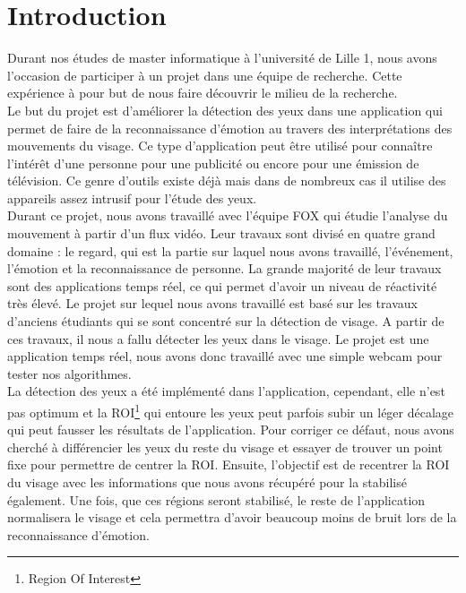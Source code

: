 \section*{Introduction}

Durant nos études de master informatique à l'université de Lille 1, nous avons l'occasion de participer à un projet
dans une équipe de recherche. Cette expérience à pour but de nous faire découvrir le milieu de la recherche.\\

Le but du projet est d'améliorer la détection des yeux dans une application qui permet de faire de la reconnaissance
d'émotion au travers des interprétations des mouvements du visage. Ce type d'application peut être utilisé pour 
connaître l'intérêt d'une personne pour une publicité ou encore pour une émission de télévision. Ce genre d'outils
existe déjà mais dans de nombreux cas il utilise des appareils assez intrusif pour l'étude des yeux.\\ 

Durant ce projet, nous avons travaillé avec l'équipe FOX qui étudie l'analyse du mouvement à partir d'un flux vidéo.
Leur travaux sont divisé en quatre grand domaine : le regard, qui est la partie sur laquel nous avons travaillé, l'événement, 
l'émotion et la reconnaissance de personne. La grande majorité de leur travaux sont des applications temps réel, ce qui
permet d'avoir un niveau de réactivité très élevé. Le projet sur lequel nous avons travaillé est basé sur les travaux
d'anciens étudiants qui se sont concentré sur la détection de visage. A partir de ces travaux, il nous a fallu détecter
les yeux dans le visage. Le projet est une application temps réel, nous avons donc travaillé avec une simple webcam pour 
tester nos algorithmes.\\

La détection des yeux a été implémenté dans l'application, cependant, elle n'est pas optimum et la ROI\footnote{Region Of Interest}
qui entoure les yeux peut parfois subir un léger décalage qui peut fausser les résultats de l'application. Pour corriger ce défaut,
nous avons cherché à différencier les yeux du reste du visage et essayer de trouver un point fixe pour permettre de centrer la ROI.
Ensuite, l'objectif est de recentrer la ROI du visage avec les informations que nous avons récupéré pour la stabilisé également.
Une fois, que ces régions seront stabilisé, le reste de l'application normalisera le visage et cela permettra d'avoir beaucoup moins
de bruit lors de la reconnaissance d'émotion.

